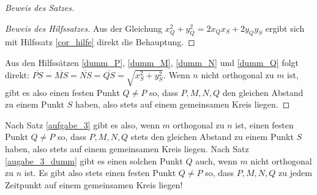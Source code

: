 \begin{proof}[Beweis des Satzes]
\begin{proof}[Beweis des Hilfssatzes]

        Aus der Gleichung $x_Q^2+y_Q^2=2x_Qx_S+2y_Qy_S$ ergibt sich mit Hilfssatz \ref{cor_hilfe} direkt die Behauptung.
    \end{proof}
    Aus den Hilfssätzen \ref{dumm_P}, \ref{dumm_M}, \ref{dumm_N} und \ref{dumm_Q} folgt direkt: 
    $\overline{PS}=\overline{MS}=\overline{NS}=\overline{QS}=\sqrt{x_S^2+y_S^2}$. Wenn $n$ nicht orthogonal zu $m$ 
    ist, gibt es also einen festen Punkt $Q\neq P$ so, dass $P, M, N, Q$ den gleichen Abstand zu einem Punkt $S$ 
    haben, also stets auf einem gemeinsamen Kreis liegen.
    \renewcommand{\qedsymbol}{$\blacksquare$}
\end{proof}

Nach Satz \ref{aufgabe_3} gibt es also,  wenn $m$ orthogonal zu $n$ ist, einen festen Punkt $Q\neq P$ so, dass $P, M, 
N, Q$ stets den gleichen Abstand zu einem Punkt $S$ haben, also stets auf einem gemeinsamen Kreis liegen. 
Nach Satz \ref{augabe_3_dumm} gibt es einen solchen Punkt $Q$ auch, wenn $m$ nicht orthogonal zu $n$ ist. Es gibt 
also stets einen festen Punkt $Q\neq P$ so, dass $P, M, N, Q$ zu jedem Zeitpunkt auf einem gemeinsamen Kreis liegen!